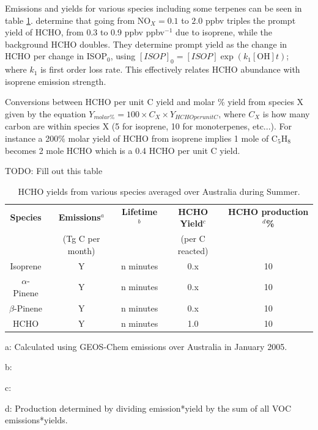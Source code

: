     
    Emissions and yields for various species including some terpenes can be seen in table \ref{BioIsop:Method:tab_VOCAusYields}.
    \textcite{Wolfe2016} determine that going from NO$_X = 0.1$ to $2.0$ ppbv triples the prompt yield of HCHO, from 0.3 to 0.9 ppbv ppbv$^{-1}$ due to isoprene, while the background HCHO doubles.
    They determine prompt yield as the change in HCHO per change in ISOP$_0$, using $[ISOP]_0=[ISOP]\exp(k_1[\mathrm{OH}]t)$; where $k_1$ is first order loss rate.
    This effectively relates HCHO abundance with isoprene emission strength.
    
        
    Conversions between HCHO per unit C yield and molar \% yield from species X given by the equation $ Y_{molar \%} = 100 \times C_X \times Y_{HCHO per unit C} $, where $C_X$ is how many carbon are within species X (5 for isoprene, 10 for monoterpenes, etc...).
    For instance a 200\% molar yield of HCHO from isoprene implies 1 mole of C$_5$H$_8$ becomes 2 mole HCHO which is a 0.4 HCHO per unit C yield.
    
    TODO: Fill out this table
    \begin{table} \begin{threeparttable}
        \caption{HCHO yields from various species averaged over Australia during Summer.}
        \begin{tabular}{ | c  c  c  c  c | }
          \toprule
          \textbf{Species}   & \textbf{Emissions$^a$}& \textbf{Lifetime$^b$}& \textbf{HCHO Yield$^c$} & \textbf{HCHO production$^d$\%}
          \\                 & (Tg C per month)      &                      & (per C reacted)         &         \\
          \midrule
          Isoprene           & Y                     & n minutes            & 0.x                     & 10       \\
          $\alpha$-Pinene    & Y                     & n minutes            & 0.x                     & 10       \\
          $\beta$-Pinene     & Y                     & n minutes            & 0.x                     & 10       \\
          HCHO               & Y                     & n minutes            & 1.0                     & 10       \\
          \bottomrule
        \end{tabular}
        \begin{tablenotes} 
          \item a: Calculated using GEOS-Chem emissions over Australia in January 2005.
          \item b:  
          \item c: 
          \item d: Production determined by dividing emission*yield by the sum of all VOC emissions*yields. 
        \end{tablenotes}
        \label{BioIsop:Method:tab_VOCAusYields}
      \end{threeparttable} \end{table}
      
